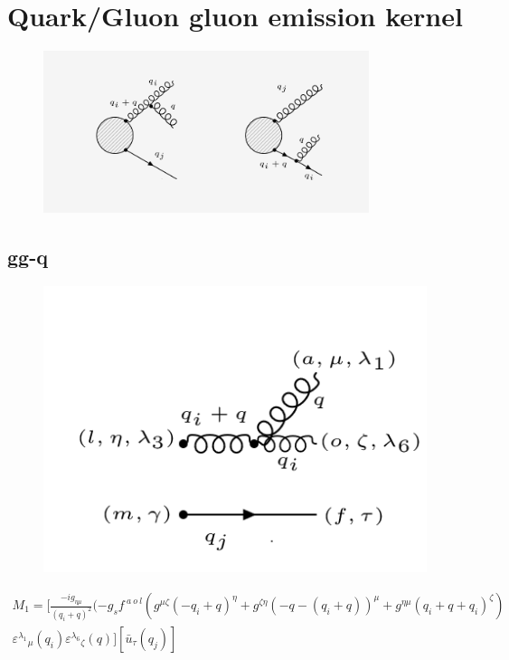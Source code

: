 \section{Quark/Gluon gluon emission kernel}

\begin{figure}[ht!]
\centering
\includegraphics[width=0.85\textwidth]{images/ggq-diagrams.png}
\end{figure}
\subsection{gg-q}
\begin{figure}[ht!]
\centering
\includegraphics[scale=0.7]{images/ggqM1.png}
\end{figure}
\begin{equation}
\begin{split}
M_1=[\frac{-ig_{{\eta}{\mu}}}{(q_i +q)^2}(-g_s f^{\:a\:o\:l}(g^{{\mu}{\zeta}}(-q_i +q)^{\eta}+g^{{\zeta}{\eta}}(-q-(q_i +q))^{\mu}+g^{{\eta}{\mu}}(q_i +q+q_i)^{\zeta})\\
{\varepsilon^{\lambda_1}}_{\mu} (q_i) {\varepsilon^{\lambda_6}}_{\zeta} (q)][\bar{u}_{\tau}(q_j)]
\end{split}
\end{equation}

